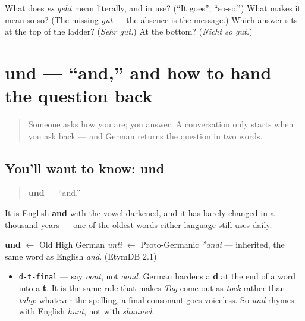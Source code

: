 \begin{tcolorbox}[breakable,colback=teal!4,colframe=teal!35!black,title={Before you move on}]
What does \emph{es geht} mean literally, and in use? (\textquotedblleft{}It goes\textquotedblright{}; \textquotedblleft{}so-so.\textquotedblright{}) What makes it mean so-so? (The missing \emph{gut} — the absence is the message.) Which answer sits at the top of the ladder? (\emph{Sehr gut.}) At the bottom? (\emph{Nicht so gut.})
\end{tcolorbox}
\section[und]{und — \textquotedblleft{}and,\textquotedblright{} and how to hand the question back}

\label{lesson:GE-C03-und}



\begin{quote}
Someone asks how you are; you answer. A conversation only starts when you ask back — and German returns the question in two words.
\end{quote}

\subsection*{You'll want to know: und}
\begin{quote}
\textbf{und} — \textquotedblleft{}and.\textquotedblright{}
\end{quote}

It is English \textbf{and} with the vowel darkened, and it has barely changed in a thousand years — one of the oldest words either language still uses daily.

\begin{cousinweb}
\textbf{und} $\leftarrow$ Old High German \emph{unti} $\leftarrow$ Proto-Germanic \emph{*andi} — inherited, the same word as English \emph{and}. (EtymDB 2.1)
\end{cousinweb}

\begin{sounds}
\begin{itemize}
\raggedright
  \item \texttt{d-t-final} — say \emph{oont}, not \emph{oond}. German hardens a \textbf{d} at the end of a word into a \textbf{t}. It is the same rule that makes \emph{Tag} come out as \emph{tock} rather than \emph{tahg}: whatever the spelling, a final consonant goes voiceless. So \emph{und} rhymes with English \emph{hunt}, not with \emph{shunned}.
\end{itemize}
\end{sounds}

